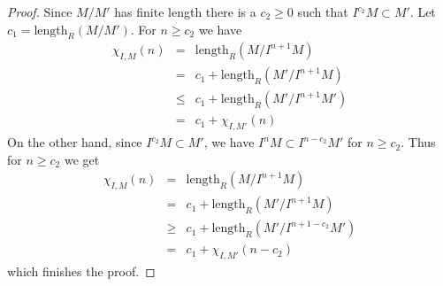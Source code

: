 \documentclass[10pt,a4paper]{amsart}
\theoremstyle{plain}
\theoremstyle{definition}
\theoremstyle{remark}
\numberwithin{equation}{subsection}
\begin{document}
\begin{proof}
Since $M/M'$ has finite length there is a $c_2 \geq 0$ such that
$I^{c_2}M \subset M'$. Let $c_1 = \text{length}_R(M/M')$.
For $n \geq c_2$ we have
\begin{eqnarray*}
\chi_{I, M}(n)
& = &
\text{length}_R(M/I^{n + 1}M) \\
& = &
c_1 + \text{length}_R(M'/I^{n + 1}M) \\
& \leq &
c_1 + \text{length}_R(M'/I^{n + 1}M') \\
& = &
c_1 + \chi_{I, M'}(n)
\end{eqnarray*}
On the other hand, since $I^{c_2}M \subset M'$,
we have $I^nM \subset I^{n - c_2}M'$ for $n \geq c_2$.
Thus for $n \geq c_2$ we get
\begin{eqnarray*}
\chi_{I, M}(n)
& = &
\text{length}_R(M/I^{n + 1}M) \\
& = &
c_1 + \text{length}_R(M'/I^{n + 1}M) \\
& \geq &
c_1 + \text{length}_R(M'/I^{n + 1 - c_2}M') \\
& = &
c_1 + \chi_{I, M'}(n - c_2)
\end{eqnarray*}
which finishes the proof.
\end{proof}
\end{document}
